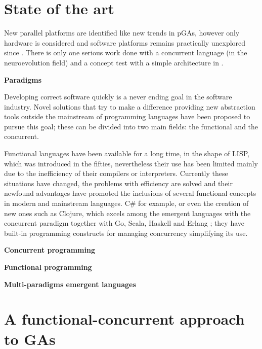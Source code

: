 \documentclass[a4paper]{llncs}
\newcommand{\simpleEntry}[1]
{
\vspace{.3cm}
\noindent \textbf{#1}
\vspace{.3cm}
}
\begin{document}
\section{State of the art}
\label{sec:stateArt}
New parallel platforms are identified like new trends in pGAs\cite{Luque2011}, however only hardware is considered and software platforms remains practically unexplored since \cite{Santos2002}. There is only one serious work \cite{Sher2013} done with a concurrent language (in the neuroevolution field) and a concept test with a simple architecture in \cite{AmandaBienz2011}.

\simpleEntry{Paradigms}
\label{sec:paradigmas}

Developing correct software quickly is a never ending goal in the software industry. Novel solutions that try to make a difference providing new abstraction tools outside the mainstream of programming languages have been proposed to pursue this goal; these can be divided into two main fields: the functional and the concurrent.

Functional languages have been available for a long time, in the shape of LISP, which was introduced in the fifties, nevertheless their use has been limited mainly due to the inefficiency of their compilers or interpreters. Currently these situations have changed, the problems with efficiency are solved and their newfound advantages have promoted the inclusions of several functional concepts in modern and mainstream languages. C\# for example, or even the creation of new ones such as Clojure, which excels among the emergent languages with the concurrent paradigm together with Go, Scala, Haskell and Erlang \cite{Nov.-Dec.2012}; they have built-in programming constructs for managing concurrency simplifying its use.



\simpleEntry{Concurrent programming}
    

\simpleEntry{Functional programming}
    

\simpleEntry{Multi-paradigms emergent languages}
    

\section{A functional-concurrent approach to GAs}
\label{sec:design}
    
\end{document}
